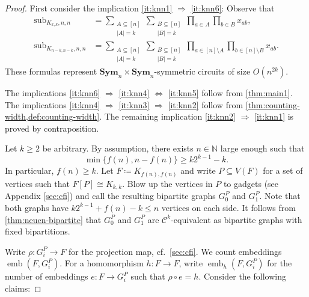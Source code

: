 \documentclass[10pt,a4paper]{article}
\theoremstyle{definition}
\theoremstyle{plain}
\theoremstyle{remark}
\DeclareMathOperator{\sub}{sub}
\DeclareMathOperator{\emb}{emb}
\newcommand{\Sym}{\mathbf{Sym}}
\begin{document}
	\begin{proof}
		First consider the implication \ref{it:knn1} $\Rightarrow$ \ref{it:knn6}:
		Observe that
		\begin{align*}
			\sub_{K_{k,k}, n,n} &= \sum_{\substack{A \subseteq [n] \\ |A| = k}}\sum_{\substack{B \subseteq [n] \\ |B| = k}} \prod_{a \in A} \prod_{b \in B} x_{ab}, \\
			\sub_{K_{n-k,n-k}, n,n} &= \sum_{\substack{A \subseteq [n] \\ |A| = k}}\sum_{\substack{B \subseteq [n] \\ |B| = k}} \prod_{a \in [n] \setminus A} \prod_{b \in [n] \setminus B} x_{ab}.
		\end{align*}
		These formulas represent $\Sym_n \times \Sym_n$-symmetric circuits of size $O(n^{2k})$.
		
		The implications \ref{it:knn6} $\Rightarrow$ \ref{it:knn4} $\Leftrightarrow$ \ref{it:knn5} follow from \cref{thm:main1}.
		The implications \ref{it:knn4} $\Rightarrow$ \ref{it:knn3} $\Rightarrow$ \ref{it:knn2} follow from \cref{thm:counting-width,def:counting-width}.
		The remaining implication \ref{it:knn2} $\Rightarrow$ \ref{it:knn1} is proved by contraposition.
		
		Let $k \geq 2$ be arbitrary.
		By assumption, there exists $n \in \mathbb{N}$ large enough such that
		\[
			\min\{ f(n), n - f(n) \} \geq  k2^{k-1} - k.
		\]
		In particular,  $f(n) \geq k$.
		Let $F \coloneqq K_{f(n), f(n)}$ and write $P \subseteq V(F)$ for a set of vertices such that $F[P] \cong K_{k,k}$.
		Blow up the vertices in $P$ to  gadgets (see Appendix \ref{sec:cfi}) and call the resulting bipartite graphs $G_0^P$ and $G_1^P$.
		Note that both graphs have $k 2^{k-1} + f(n) - k \leq n$ vertices on each side.
		It follows from \cref{thm:neuen-bipartite} that
		$G_0^P$ and $G_1^P$ are $\mathcal{C}^k$-equivalent as bipartite graphs with fixed bipartitions.
		
		Write $\rho \colon G_i^P \to F$ for the projection map, cf.\ \cref{sec:cfi}.
		We count embeddings $\emb(F, G_i^P)$.
		For a homomorphism $h \colon F \to F$, 
		write $\emb_h(F, G_i^P)$ for the number of embeddings $e \colon F \to G_i^P$ such that $\rho \circ e = h$.
		Consider the following claims:
		

\end{proof}
\end{document}
